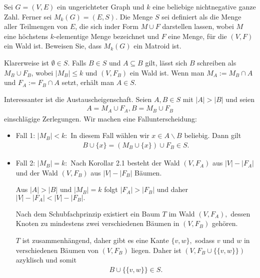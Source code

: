 
\begin{exercise}

Sei $G = (V, E)$ ein ungerichteter Graph und $k$ eine beliebige nichtnegative ganze Zahl. Ferner sei $M_k(G) = (E, S)$. Die Menge $S$ sei definiert als die Menge aller Teilmengen von $E$, die sich inder Form $M \cup F$ darstellen lassen, wobei $M$ eine höchstens $k$-elementige Menge bezeichnet und $F$ eine Menge, für die $(V, F)$ ein Wald ist. Beweisen Sie, dass $M_k(G)$ ein Matroid ist.

\end{exercise}


\begin{solution}

  Klarerweise ist $\emptyset \in S.$ Falls $B \in S$ und $A \subseteq B$ gilt, lässt sich $B$ schreiben als $M_B \cup F_B$, wobei $|M_B| \leq k$ und $(V, F_B)$ ein Wald ist. Wenn man $M_A := M_B \cap A$ und $F_A := F_B \cap A$ setzt, erhält man $A \in S$.

  Interessanter ist die Austauscheigenschaft. Seien $A, B \in S$ mit $|A| > |B|$ und seien
  \begin{align*}
      A = M_A \cup F_A, B = M_B \cup F_B
  \end{align*}
  einschlägige Zerlegungen.
  Wir machen eine Fallunterscheidung:
  \begin{itemize}
      \item Fall 1: $|M_B| < k:$ In diesem Fall wählen wir $x \in A\backslash B$ beliebig. Dann gilt
      \begin{align*}
      B \cup \{x\} = (M_B \cup \{x\}) \cup F_B \in S.
      \end{align*}
      \item Fall 2: $|M_B| = k:$ Nach Korollar 2.1 besteht der Wald $(V, F_A)$ aus $|V| - |F_A|$ und der Wald $(V, F_B)$ aus $|V| - |F_B|$ Bäumen.

      Aus $|A| > |B|$ und $|M_B| = k$ folgt $|F_A| > |F_B|$ und daher $|V| - |F_A| < |V| - |F_B|.$

      Nach dem Schubfachprinzip existiert ein Baum $T$ im Wald $(V, F_A),$ dessen Knoten zu mindestens zwei verschiedenen Bäumen in $(V, F_B)$ gehören.

      $T$ ist zusammenhängend, daher gibt es eine Kante $\{v, w\},$ sodass $v$ und $w$ in verschiedenen Bäumen von $(V, F_B)$ liegen. Daher ist $(V, F_B \cup \{\{v, w\}\})$ azyklisch und somit
      \begin{align*}
          B \cup \{\{v, w\}\} \in S.
      \end{align*}
  \end{itemize}
\end{solution}

